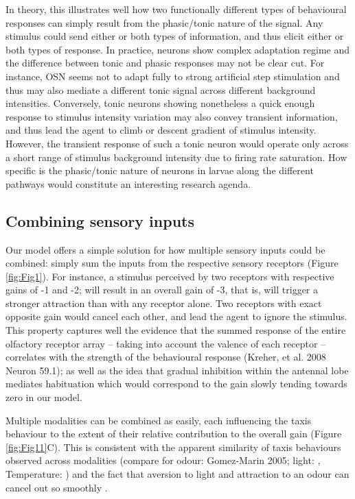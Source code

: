 \documentclass[10pt,a4paper]{article}
\begin{document}
In theory, this illustrates well how two functionally different types of behavioural responses can simply result from the phasic/tonic nature of the signal. Any stimulus could send either or both types of information, and thus elicit either or both types of response. In practice, neurons show complex adaptation regime and the difference between tonic and phasic responses may not be clear cut. For instance, OSN seems not to adapt fully to strong artificial step stimulation \citep{nagel2011biophysical,schulze2015dynamical} and thus may also mediate a different tonic signal across different background intensities. Conversely, tonic neurons showing nonetheless a quick enough response to stimulus intensity variation may also convey transient information, and thus lead the agent to climb or descent gradient of stimulus intensity. However, the transient response of such a tonic neuron would operate only across a short range of stimulus background intensity due to firing rate saturation. How specific is the phasic/tonic nature of neurons in larvae along the different pathways would constitute an interesting research agenda.

\subsection{Combining sensory inputs}
Our model offers a simple solution for how multiple sensory inputs could be combined: simply sum the inputs from the respective sensory receptors (Figure \ref{fig:Fig1}). For instance, a stimulus perceived by two receptors with respective gains of -1 and -2; will result in an overall gain of -3, that is, will trigger a stronger attraction than with any receptor alone. Two receptors with exact opposite gain would cancel each other, and lead the agent to ignore the stimulus. This property captures well the evidence that the summed response of the entire olfactory receptor array – taking into account the valence of each receptor – correlates with the strength of the behavioural response (Kreher, et al. 2008 Neuron 59.1); as well as the idea that gradual inhibition within the antennal lobe mediates habituation \citep{das2011plasticity} which would correspond to the gain slowly tending towards zero in our model. 

Multiple modalities can be combined as easily, each influencing the taxis behaviour to the extent of their relative contribution to the overall gain (Figure \ref{fig:Fig11}C). This is consistent with the apparent similarity of taxis behaviours observed across modalities (compare for odour: Gomez-Marin 2005; light: \cite{kane2013sensorimotor},   Temperature: \cite{lahiri2011two}) and the fact that aversion to light and attraction to an odour can cancel out so smoothly \cite{bellmann2010optogenetically}. 
\end{document}
